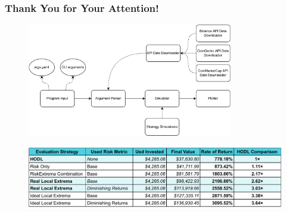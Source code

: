 

\begin{frame}
  \frametitle{Thank You for Your Attention!}
  \centering


  \begin{figure}
    \includegraphics[width=0.8\textwidth]{img/structure-diagram.pdf}
  \end{figure}

  \begin{figure}
    \includegraphics[width=\textwidth]{img/long-term-table.pdf}
  \end{figure}
\end{frame}


